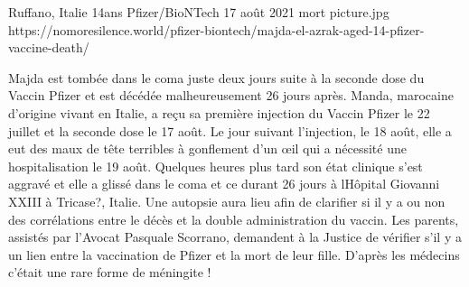           {Ruffano, Italie}
          {14ans}
          {Pfizer/BioNTech}
          {17 août 2021}
          {mort}
          {picture.jpg}
          {https://nomoresilence.world/pfizer-biontech/majda-el-azrak-aged-14-pfizer-vaccine-death/}
          {

Majda est tombée dans le coma juste deux jours suite à la seconde dose du Vaccin
Pfizer et est décédée malheureusement 26 jours après. Manda, marocaine d’origine
vivant en Italie, a reçu sa première injection du Vaccin Pfizer le 22 juillet et
la seconde dose le 17 août. Le jour suivant l’injection, le 18 août, elle a eut
des maux de tête terribles à gonflement d’un œil qui a nécessité une
hospitalisation le 19 août. Quelques heures plus tard son état clinique s’est
aggravé et elle a glissé dans le coma et ce durant 26 jours à lHôpital Giovanni
XXIII à Tricase?, Italie. Une autopsie aura lieu afin de clarifier si il y a ou
non des corrélations entre le décès et la double administration du vaccin. Les
parents, assistés par l’Avocat Pasquale Scorrano, demandent à la Justice de
vérifier s’il y a un lien entre la vaccination de Pfizer et la mort de leur
fille. D’après les médecins c’était une rare forme de méningite !

}
